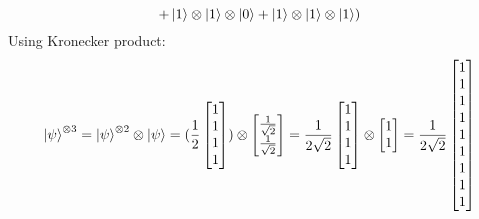 \documentclass{article}
\begin{document}
\begin{framed}
$$    $$
    $$
    + \ket{1} \otimes \ket{1} \otimes \ket{0} + \ket{1} \otimes \ket{1} \otimes \ket{1})
    $$
    Using Kronecker product:
    $$
    \ket{\psi}^{\otimes3} = \ket{\psi}^{\otimes2} \otimes \ket{\psi} = (\frac{1}{2}\begin{bmatrix}1 \\ 1\\ 1\\ 1\end{bmatrix}) \otimes \begin{bmatrix} \frac{1}{\sqrt{2}}\\\frac{1}{\sqrt{2}}\end{bmatrix} = \frac{1}{2\sqrt{2}}\begin{bmatrix}1 \\ 1\\ 1\\ 1\end{bmatrix} \otimes \begin{bmatrix}1 \\1 \end{bmatrix} = \frac{1}{2\sqrt{2}}\begin{bmatrix}1 \\ 1\\ 1\\ 1\\ 1\\ 1\\ 1\\ 1\\ 1\end{bmatrix}
    $$
    \medskip
    
    
\end{framed}

\bigskip
\end{document}

